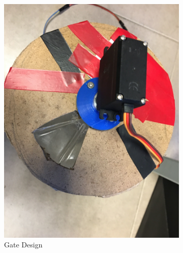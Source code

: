 \begin{figure}[h]
     \centering
     \begin{subfigure}[b]{0.49\linewidth}
     \includegraphics[width=\linewidth]{content/kapak.jpg}
     \caption{Gate Design}
     \label{fig:gate}
     \end{subfigure}
     \begin{subfigure}[b]{0.49\linewidth}

\end{subfigure}
\end{figure}
